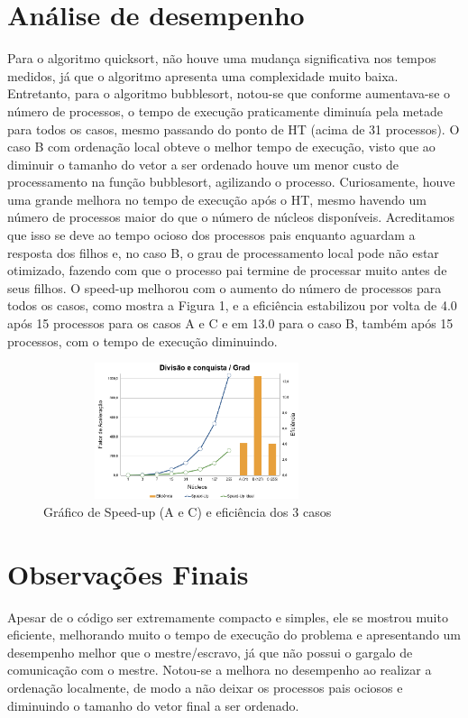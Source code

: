 \documentclass{article}
\begin{document}
\begin{multicols*}{2}
\section{Análise de desempenho}
Para o algoritmo quicksort, não houve uma mudança significativa nos tempos medidos, já que o algoritmo apresenta uma complexidade muito baixa. Entretanto, para o algoritmo bubblesort, notou-se que conforme aumentava-se o número de processos, o tempo de execução praticamente diminuía pela metade para todos os casos, mesmo passando do ponto de HT (acima de 31 processos). O caso B com ordenação local obteve o melhor tempo de execução, visto que ao diminuir o tamanho do vetor a ser ordenado houve um menor custo de processamento na função bubblesort, agilizando o processo. Curiosamente, houve uma grande melhora no tempo de execução após o HT, mesmo havendo um número de processos maior do que o número de núcleos disponíveis. Acreditamos que isso se deve ao tempo ocioso dos processos pais enquanto aguardam a resposta dos filhos e, no caso B, o grau de processamento local pode não estar otimizado, fazendo com que o processo pai termine de processar muito antes de seus filhos. O speed-up melhorou com o aumento do número de processos para todos os casos, como mostra a Figura 1, e a eficiência estabilizou por volta de 4.0 após 15 processos para os casos A e C e em 13.0 para o caso B, também após 15 processos, com o tempo de execução diminuindo.
\begin{figure}[H]
            \centering
            \vspace{-1.1em}
            \includegraphics[width=9cm, height=4cm]{grafico.png}
            \vspace{-1.9em}
            \caption{Gráfico de Speed-up (A e C) e eficiência dos 3 casos}
            \vspace{-1.2em}
\end{figure}
\section{Observações Finais}
Apesar de o código ser extremamente compacto e simples, ele se mostrou muito eficiente, melhorando muito o tempo de execução do problema e apresentando um desempenho melhor que o mestre/escravo, já que não possui o gargalo de comunicação com o mestre. Notou-se a melhora no desempenho ao realizar a ordenação localmente, de modo a não deixar os processos pais ociosos e diminuindo o tamanho do vetor final a ser ordenado.

\end{multicols*}

\newpage


\end{document}
